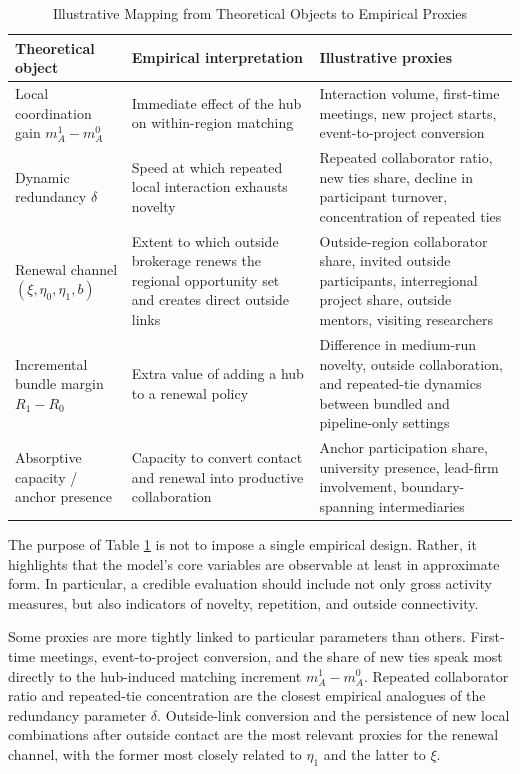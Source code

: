 \begin{table}[htbp]
\centering
\caption{Illustrative Mapping from Theoretical Objects to Empirical Proxies}
\label{tab:proxy_mapping}
\begin{tabular}{p{} p{} p{}}
\toprule
Theoretical object & Empirical interpretation & Illustrative proxies \\
\midrule
Local coordination gain $m_A^1-m_A^0$
& Immediate effect of the hub on within-region matching
& Interaction volume, first-time meetings, new project starts, event-to-project conversion \\

Dynamic redundancy $\delta$
& Speed at which repeated local interaction exhausts novelty
& Repeated collaborator ratio, new ties share, decline in participant turnover, concentration of repeated ties \\

Renewal channel $(\xi,\eta_0,\eta_1,b)$
& Extent to which outside brokerage renews the regional opportunity set and creates direct outside links
& Outside-region collaborator share, invited outside participants, interregional project share, outside mentors, visiting researchers \\

Incremental bundle margin $R_1-R_0$
& Extra value of adding a hub to a renewal policy
& Difference in medium-run novelty, outside collaboration, and repeated-tie dynamics between bundled and pipeline-only settings \\

Absorptive capacity / anchor presence
& Capacity to convert contact and renewal into productive collaboration
& Anchor participation share, university presence, lead-firm involvement, boundary-spanning intermediaries \\
\bottomrule
\end{tabular}
\end{table}

The purpose of Table \ref{tab:proxy_mapping} is not to impose a single empirical design. Rather, it highlights that the model's core variables are observable at least in approximate form. In particular, a credible evaluation should include not only gross activity measures, but also indicators of novelty, repetition, and outside connectivity.

Some proxies are more tightly linked to particular parameters than others. First-time meetings, event-to-project conversion, and the share of new ties speak most directly to the hub-induced matching increment $m_A^1-m_A^0$. Repeated collaborator ratio and repeated-tie concentration are the closest empirical analogues of the redundancy parameter $\delta$. Outside-link conversion and the persistence of new local combinations after outside contact are the most relevant proxies for the renewal channel, with the former most closely related to $\eta_1$ and the latter to $\xi$.

